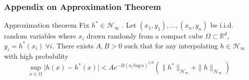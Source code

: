\documentclass{beamer}
\begin{document}
\begin{frame}
\frametitle{Appendix on Approximation Theorem}
\begin{block}{Approximation theorem}
	Fix $h^* \in \mathcal{H}_\infty $  .
	Let $(x_1,y_1), ..., (x_n,y_n)$ be i.i.d. random variables where $x_i$ drawn randomly from a compact cube $\Omega \subset \mathbb{R}^d $,
	$y_i = h^*(x_i) \: \forall i$. There exists $A, B > 0$ such that for any interpolating $h \in \mathcal{H}_\infty $ with high probability
	\[ \sup_{x \in \Omega} \vert h(x) - h^*(x)\vert < A e^{-B(n/log \, n)^{1/d}} (\| h^* \|_{\mathcal{H}_\infty} + \| h \|_{\mathcal{H}_\infty}) \]
\end{block}
\end{frame}

\end{document}
